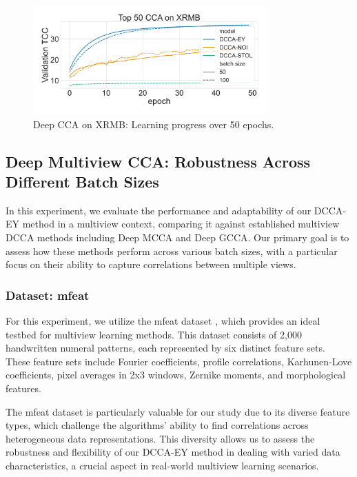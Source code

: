 \begin{figure}
    \centering
    \includegraphics[width=0.8\textwidth]{figures/DCCA/XRMB_allbatchsizes_pcc}
    \caption{Deep CCA on XRMB: Learning progress over 50 epochs.}
    \label{fig:lr_xrmb}
\end{figure}

\subsection{Deep Multiview CCA: Robustness Across Different Batch Sizes}

In this experiment, we evaluate the performance and adaptability of our DCCA-EY method in a multiview context, comparing it against established multiview DCCA methods including Deep MCCA and Deep GCCA. Our primary goal is to assess how these methods perform across various batch sizes, with a particular focus on their ability to capture correlations between multiple views.

\subsubsection{Dataset: mfeat}

For this experiment, we utilize the mfeat dataset \citep{misc_multiple_features_72}, which provides an ideal testbed for multiview learning methods. This dataset consists of 2,000 handwritten numeral patterns, each represented by six distinct feature sets. These feature sets include Fourier coefficients, profile correlations, Karhunen-Love coefficients, pixel averages in 2x3 windows, Zernike moments, and morphological features.

The mfeat dataset is particularly valuable for our study due to its diverse feature types, which challenge the algorithms' ability to find correlations across heterogeneous data representations. This diversity allows us to assess the robustness and flexibility of our DCCA-EY method in dealing with varied data characteristics, a crucial aspect in real-world multiview learning scenarios.

